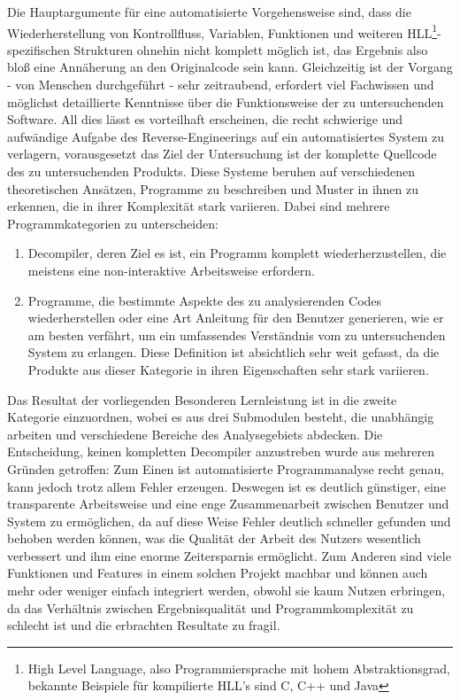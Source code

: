 \documentclass[11pt]{article}
\begin{document}
Die Hauptargumente für eine automatisierte Vorgehensweise sind, dass die Wiederherstellung von Kontrollfluss,
Variablen, Funktionen und weiteren HLL\footnote{High Level Language, also Programmiersprache mit hohem
Abstraktionsgrad, bekannte Beispiele für kompilierte HLL's sind C, C++ und Java}-spezifischen Strukturen
ohnehin nicht komplett möglich ist, das Ergebnis also bloß eine Annäherung an den Originalcode sein kann.
Gleichzeitig ist der Vorgang - von Menschen durchgeführt - sehr zeitraubend, erfordert viel
Fachwissen und möglichst detaillierte Kenntnisse über die Funktionsweise der zu untersuchenden Software.
All dies lässt es vorteilhaft erscheinen, die recht schwierige und aufwändige  Aufgabe des
Reverse-Engineerings auf ein automatisiertes System zu verlagern, vorausgesetzt das Ziel der Untersuchung
ist der komplette Quellcode des zu untersuchenden Produkts. Diese Systeme beruhen auf verschiedenen
theoretischen Ansätzen, Programme zu beschreiben und Muster in ihnen zu erkennen, die in ihrer Komplexität
stark variieren. Dabei sind mehrere Programmkategorien zu unterscheiden:
\begin{enumerate}
	\item{Decompiler, deren Ziel es ist, ein Programm
		komplett wiederherzustellen, die meistens eine non-interaktive Arbeitsweise erfordern.}
	\item{Programme, die bestimmte Aspekte des zu analysierenden Codes wiederherstellen oder eine Art
		Anleitung für den Benutzer generieren, wie er am besten verfährt, um ein umfassendes Verständnis
		vom zu untersuchenden System zu erlangen. Diese Definition ist absichtlich sehr weit gefasst, da
        die Produkte aus dieser Kategorie in ihren Eigenschaften sehr stark variieren.
      }
\end{enumerate}

Das Resultat der vorliegenden Besonderen Lernleistung ist in
die zweite Kategorie einzuordnen, wobei es aus drei Submodulen besteht, die unabhängig arbeiten und
verschiedene Bereiche des Analysegebiets abdecken. Die Entscheidung, keinen kompletten Decompiler
anzustreben wurde aus mehreren Gründen getroffen: Zum Einen ist automatisierte Programmanalyse recht
genau, kann jedoch trotz allem Fehler erzeugen. Deswegen ist es deutlich günstiger, eine
transparente Arbeitsweise und eine enge Zusammenarbeit zwischen Benutzer und System zu ermöglichen,
da auf diese Weise Fehler deutlich schneller gefunden und behoben werden können, was die Qualität
der Arbeit des Nutzers wesentlich verbessert und ihm eine enorme Zeitersparnis ermöglicht. Zum Anderen sind
viele Funktionen und Features in einem solchen Projekt machbar und können auch mehr oder weniger
einfach integriert werden, obwohl sie kaum Nutzen erbringen, da das Verhältnis zwischen
Ergebnisqualität und Programmkomplexität zu schlecht ist und die erbrachten Resultate zu fragil.
\end{document}
